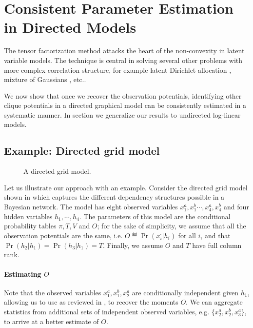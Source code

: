 \section{Consistent Parameter Estimation in Directed Models}
\label{sec:directed}

The tensor factorization method attacks the heart of the non-convexity
  in latent variable models.
The technique is central in solving several other problems with more
  complex correlation structure, for example latent Dirichlet allocation
  \citep{anandkumar12lda}, mixture of Gaussians \citep{hsu13spherical},
  etc..

We now show that once we recover the observation
  potentials, identifying other clique potentials in a directed graphical
  model can be consistently estimated in a systematic manner.
In section  we generalize our results to
  undirected log-linear models.

\subsection{Example: Directed grid model}

\begin{figure}
  \centering
  
  \caption{A directed grid model.}
  \label{fig:grid}
\end{figure}

Let us illustrate our approach with an example. 
Consider the directed grid model shown in  which
  captures the different dependency structures possible in a Bayesian network.
The model has eight observed variables $x^a_1, x^b_1 \cdots, x^a_4, x^b_4$ and four
  hidden variables $h_1, \cdots, h_4$.
The parameters of this model are the conditional probability tables
  $\pi, T, V$ and $O$; for the sake of simplicity, we assume that all
  the observation potentials are the same, i.e. $O \eqdef \Pr(x^\cdot_i
  | h_i)$ for all $i$, and that $\Pr(h_2 | h_1) = \Pr(h_3 | h_1) = T$.
Finally, we assume $O$ and $T$ have full column rank.

\paragraph{Estimating $O$}

Note that the observed variables $x^a_1, x^b_1, x^a_2$ are
  conditionally independent given $h_1$, allowing us to use
  \TensorFactorize as reviewed in , to recover
  the moments $O$.
We can aggregate statistics from additional sets of independent observed
  variables, e.g. $\{x^a_2, x^b_2, x^a_3\}$, to arrive at a better
  estimate of $O$.

